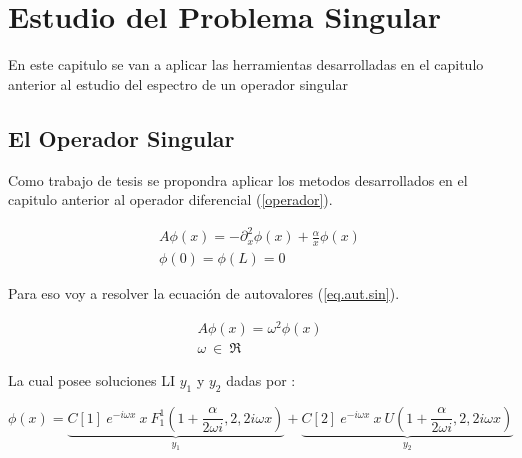 
\chapter{Estudio del Problema Singular}

En este capitulo se van a aplicar las herramientas desarrolladas en el capitulo anterior al estudio del espectro de un operador singular

\section{El Operador Singular}

Como trabajo de tesis se propondra aplicar los metodos desarrollados en el capitulo anterior al operador diferencial (\ref{operador}).

\begin{equation}
\begin{array}{c}
    A \phi (x) = - \partial ^2 _x  \phi(x) + \frac{\alpha}{x} \phi(x) \\
    \phi(0) = \phi(L) = 0 
\end{array}
\label{operador}
\end{equation}

Para eso voy a resolver la ecuación de autovalores (\ref{eq.aut.sin}).

\begin{equation}
\begin{array}{c}
    A  \phi (x)  =   \omega ^2 \phi (x) \\ 
    \omega \ \in \ \mathfrak{R}
\end{array}
\label{eq.aut.sin}
\end{equation}

La cual posee soluciones LI $ y_1 $ y $ y_2 $ dadas por :

\begin{equation}
    \phi (x) = 
    \underbrace{
    C[1] \ e ^{-i \omega x} \ x \ F _{1} ^{1} (1+\frac{ \alpha}{2 \omega i },2,2 i \omega x) } _ {y_1}
    + \underbrace{C[2] \ e^{-i \omega x } \ x \ U (1+\frac{ \alpha}{2 \omega i },2,2 i \omega x) } _{y_2} 
\end{equation}




